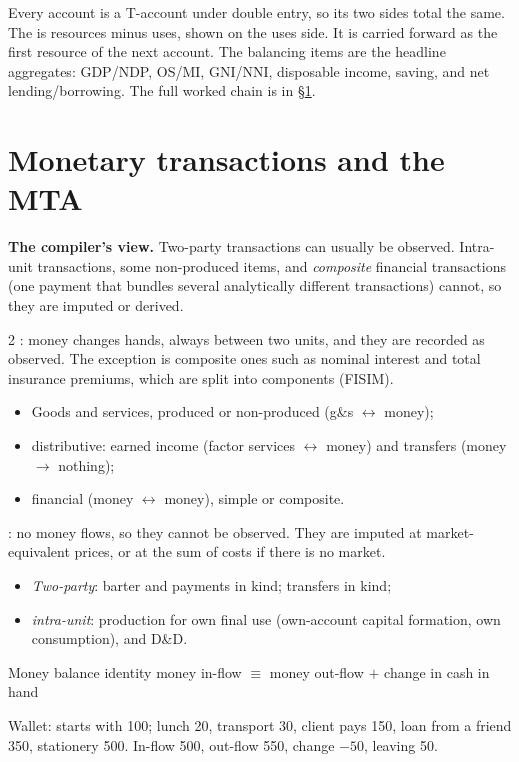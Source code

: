 Every account is a T-account under double entry, so its two sides total the same. The
 is resources minus uses, shown on the uses side. It is carried forward as the
first resource of the next account. The balancing items are the headline aggregates: GDP/NDP,
OS/MI, GNI/NNI, disposable income, saving, and net lending/borrowing. The full worked chain is in
\S\ref{sec:mta}.

\section{Monetary transactions and the MTA}\label{sec:mta}

\textbf{The compiler's view.} Two-party transactions can usually be observed. Intra-unit
transactions, some non-produced items, and \emph{composite} financial transactions (one payment
that bundles several analytically different transactions) cannot, so they are imputed or derived.

\begin{multicols}{2}\small
{}: money changes hands, always between two units, and they are recorded
as observed. The exception is composite ones such as nominal interest and total insurance
premiums, which are split into components (FISIM).
\begin{itemize}
\item Goods and services, produced or non-produced (g\&s $\leftrightarrow$ money);
\item distributive: earned income (factor services $\leftrightarrow$ money) and transfers
  (money $\to$ nothing);
\item financial (money $\leftrightarrow$ money), simple or composite.
\end{itemize}
\columnbreak
{}: no money flows, so they cannot be observed. They are imputed at
market-equivalent prices, or at the sum of costs if there is no market.
\begin{itemize}
\item \emph{Two-party}: barter and payments in kind; transfers in kind;
\item \emph{intra-unit}: production for own final use (own-account capital formation, own
  consumption), and D\&D.
\end{itemize}
\end{multicols}

\begin{keybox}{Money balance identity}
\centering money in-flow $\equiv$ money out-flow $+$ change in cash in hand\\[1pt]
\raggedright\small Wallet: starts with 100; lunch 20, transport 30, client pays 150, loan from a
friend 350, stationery 500. In-flow 500, out-flow 550, change $-50$, leaving 50.
\end{keybox}

